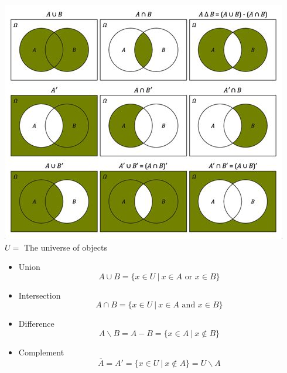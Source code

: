 \documentclass{article}
\begin{document}
\includegraphics[width=\textwidth]{l1_venn_ab}
$U =$ The universe of objects
\begin{itemize}
    \item Union
          \[
              A \cup B =\{x\in U \ | \ x \in A \text{ or } x \in B\}
          \]
    \item Intersection
          \[
              A \cap B = \{x \in U \ | \ x \in A \text{ and } x \in B\}
          \]
    \item Difference
          \[
              A \backslash B = A-B = \{x \in A \ | \ x \notin B\}
          \]
    \item Complement \[
              \overline{A} = A' = \{x \in U \ | \ x \notin A\} = U \backslash A
          \]
\end{itemize}
\end{document}
